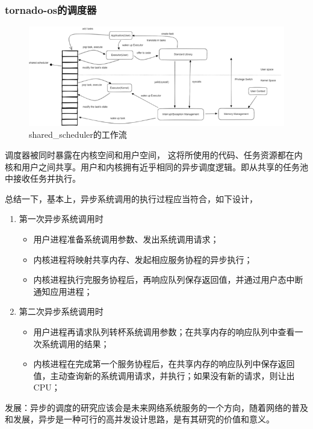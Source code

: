 \subsubsection{tornado-os的调度器}

\begin{figure}[htb]
    \figureCapSet
    \centering
    \includegraphics[width=.8\linewidth]{figure/c1/sharedscheduler.png}
    \caption{shared\_scheduler的工作流}
    \label{figure:c1sharedscheduler}
\end{figure}

调度器被同时暴露在内核空间和用户空间， 这将所使用的代码、任务资源都在内核和用户之间共享。用户和内核拥有近乎相同的异步调度逻辑。即从共享的任务池中接收任务并执行。

总结一下，基本上，异步系统调用的执行过程应当符合，如下设计，


\begin{enumerate}
    \item 第一次异步系统调用时
    \begin{itemize}
        \item 用户进程准备系统调用参数、发出系统调用请求；
        \item 内核进程将映射共享内存、发起相应服务协程的异步执行；
        \item 内核进程执行完服务协程后，再响应队列保存返回值，并通过用户态中断通知应用进程；
    \end{itemize}

    \item 第二次异步系统调用时
    \begin {itemize}
        \item 用户进程再请求队列转杯系统调用参数；在共享内存的响应队列中查看一次系统调用的结果；
        \item 内核进程在完成第一个服务协程后，在共享内存的响应队列中保存返回值，主动查询新的系统调用请求，并执行；如果没有新的请求，则让出CPU；
    \end{itemize}
\end{enumerate}

发展：异步的调度的研究应该会是未来网络系统服务的一个方向，随着网络的普及和发展，异步是一种可行的高并发设计思路，是有其研究的价值和意义。





